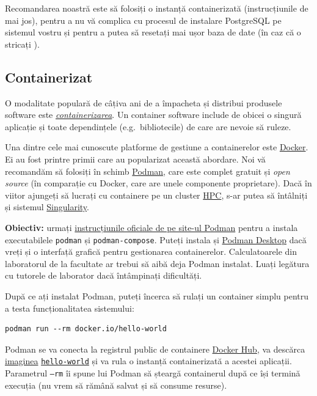 \documentclass[a4paper, 12pt]{article}
\begin{document}
Recomandarea noastră este să folosiți o instanță containerizată (instrucțiunile de mai jos), pentru a nu vă complica cu procesul de instalare PostgreSQL pe sistemul vostru și pentru a putea să resetați mai ușor baza de date (în caz că o stricați ).

\subsection{Containerizat}

O modalitate populară de câțiva ani de a împacheta și distribui produsele software este \href{https://www.docker.com/}{\emph{containerizarea}}. Un container software include de obicei o singură aplicație și toate dependințele (e.g.~bibliotecile) de care are nevoie să ruleze.

Una dintre cele mai cunoscute platforme de gestiune a containerelor este \href{https://www.docker.com/}{Docker}. Ei au fost printre primii care au popularizat această abordare. Noi vă recomandăm să folosiți în schimb \href{https://podman.io/}{Podman}, care este complet gratuit și \textit{open source} (în comparație cu Docker, care are unele componente proprietare). Dacă în viitor ajungeți să lucrați cu containere pe un cluster \href{https://en.wikipedia.org/wiki/High-performance_computing}{HPC}, s-ar putea să întâlniți și sistemul \href{https://docs.sylabs.io/guides/4.6/user-guide/}{Singularity}.

\textbf{Obiectiv:} urmați \href{https://podman.io/get-started}{instrucțiunile oficiale de pe site-ul Podman} pentru a instala executabilele \texttt{podman} și \texttt{podman-compose}. Puteți instala și \href{https://podman-desktop.io/downloads}{Podman Desktop} dacă vreți și o interfață grafică pentru gestionarea containerelor. Calculatoarele din laboratorul de la facultate ar trebui să aibă deja Podman instalat. Luați legătura cu tutorele de laborator dacă întâmpinați dificultăți.

După ce ați instalat Podman, puteți încerca să rulați un container simplu pentru a testa funcționalitatea sistemului:

\begin{verbatim}
podman run --rm docker.io/hello-world
\end{verbatim}

Podman se va conecta la registrul public de containere \href{https://hub.docker.com/}{Docker Hub}, va descărca \href{https://www.ibm.com/think/topics/container-images}{imaginea} \href{https://hub.docker.com/_/hello-world/}{\texttt{hello-world}} și va rula o instanță containerizată a acestei aplicații. Parametrul \texttt{--rm} îi spune lui Podman să șteargă containerul după ce își termină execuția (nu vrem să rămână salvat și să consume resurse).
\end{document}
